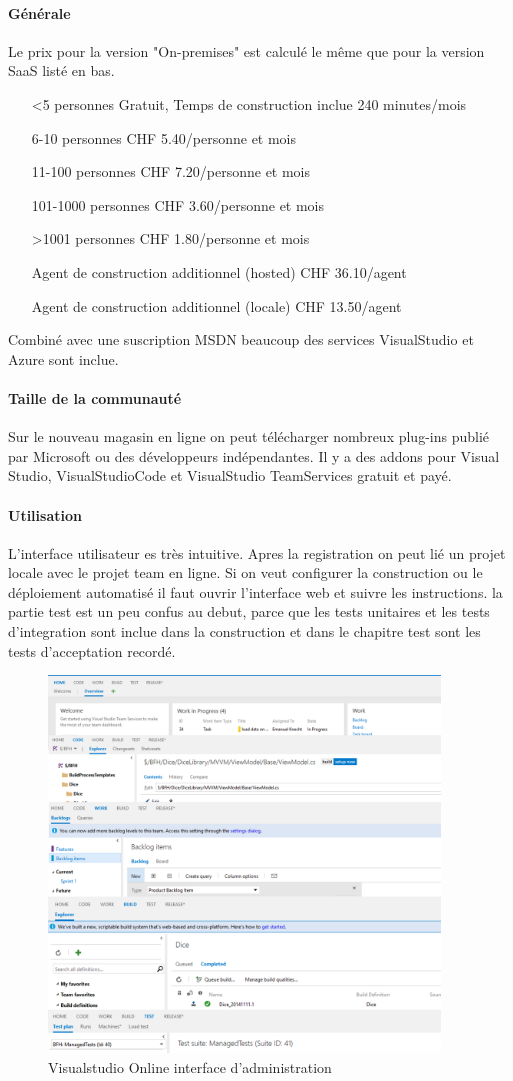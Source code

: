 \paragraph{Générale}  Le prix pour la version "On-premises" est calculé le même que pour la version SaaS listé en bas.
\begin{itemize}
\item[<5 personnes] Gratuit, Temps de construction inclue 240 minutes/mois
\item[6-10 personnes] CHF 5.40/personne et mois
\item[11-100 personnes]  CHF 7.20/personne et mois
\item[101-1000 personnes]  CHF 3.60/personne et mois
\item[>1001 personnes]  CHF 1.80/personne et mois
\item[Agent de construction additionnel (hosted)]  CHF 36.10/agent
\item[Agent de construction additionnel (locale)]  CHF 13.50/agent
\end{itemize}
Combiné avec une suscription MSDN beaucoup des services VisualStudio et Azure sont inclue.
\paragraph{Taille de la communauté} Sur le nouveau magasin en ligne on peut télécharger nombreux plug-ins publié par Microsoft ou des développeurs indépendantes. Il y a des addons pour Visual Studio, VisualStudioCode et VisualStudio TeamServices gratuit et payé.
\paragraph{Utilisation} L'interface utilisateur es très intuitive. Apres la registration on peut lié un projet locale avec le projet team en ligne. Si on veut configurer la construction ou le déploiement automatisé il faut ouvrir l'interface web et suivre les instructions. 
la partie test est un peu confus au debut, parce que les tests unitaires et les tests d'integration sont inclue dans la construction et dans le chapitre test sont les tests d'acceptation recordé.

\begin{figure}[H]
	\centering
		\includegraphics[height=10cm]{bilder/vso}
	\caption{Visualstudio Online interface d'administration}
	\label{fig:vsogui}
\end{figure}

